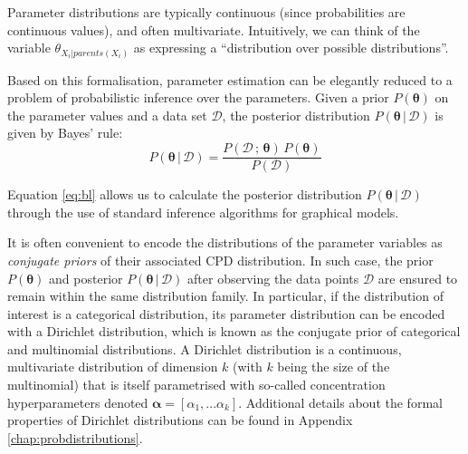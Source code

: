 Parameter distributions are typically continuous (since probabilities are continuous values), and often multivariate.  Intuitively, we can think of the variable $\theta_{X_i|parents(X_i)}$ as expressing a ``distribution over possible distributions''.  

Based on this formalisation, parameter estimation can be elegantly reduced to a problem of probabilistic inference over the parameters. Given a prior $P(\boldsymbol\theta)$ on the parameter values and a data set $\mathcal{D}$, the posterior distribution $P(\boldsymbol\theta  \, | \, \mathcal{D})$ is given by Bayes' rule: 
\begin{equation}
P(\boldsymbol\theta  \, | \, \mathcal{D}) =  \frac{P(\mathcal{D} \, ; \, \boldsymbol\theta) \, P(\boldsymbol\theta)}{P(\mathcal{D})} \label{eq:bl}
\end{equation}


Equation \ref{eq:bl} allows us to calculate the posterior distribution $P(\boldsymbol\theta  \, | \, \mathcal{D})$ through the use of standard inference algorithms for graphical models. 

It is often convenient to encode the distributions of the parameter variables as \textit{conjugate priors} of their associated CPD distribution. In such case, the prior $P(\boldsymbol\theta)$ and posterior $P(\boldsymbol\theta  \, | \, \mathcal{D})$ after observing the data points $\mathcal{D}$ are ensured to remain within the same distribution family. In particular, if the distribution of interest is a categorical distribution, its parameter distribution can be encoded with a Dirichlet distribution, which is known as the conjugate prior of categorical and multinomial distributions. A Dirichlet distribution is a continuous, multivariate distribution of dimension $k$ (with $k$ being the size of the multinomial) that is itself parametrised with so-called concentration hyperparameters denoted $\boldsymbol\alpha = [ \alpha_1,... \alpha_k ]$. Additional details about the formal properties of Dirichlet distributions can be found in Appendix \ref{chap:probdistributions}.

